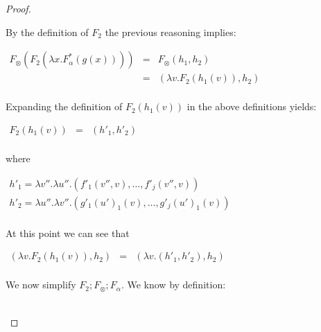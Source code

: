 \documentclass{elsarticle}
\begin{document}
\begin{proof}
\begin{report}
\begin{center}
\begin{itemize}
      By the definition of $F_2$ the previous reasoning implies:
      \begin{center}
        \begin{math}
          \begin{array}{lll}
            F_\otimes(F_2(\lambda x.F^*_\alpha(g(x))))
            & = & F_\otimes(h_1,h_2)\\
            & = & (\lambda v.F_2(h_1(v)),h_2)\\
          \end{array}
        \end{math}
      \end{center}
      Expanding the definition of $F_2(h_1(v))$ in the above definitions yields:
      \begin{center}
        \begin{math}
          \begin{array}{lll}
            F_2(h_1(v))
            & = & (h'_1,h'_2)\\
          \end{array}
        \end{math}
      \end{center}
      where
      \begin{center}
        \begin{math}
          \begin{array}{lll}
            h'_1 = \lambda v''.\lambda u''.(f'_1(v'',v),\ldots,f'_j(v'',v))\\
            h'_2 = \lambda u''.\lambda v''.(g'_1(u')_1(v),\ldots,g'_j(u')_1(v))\\
          \end{array}
        \end{math}
      \end{center}
      At this point we can see that
      \begin{center}
        \begin{math}
          \begin{array}{lll}
            (\lambda v.F_2(h_1(v)),h_2) & = & (\lambda v.(h'_1,h'_2),h_2)\\
          \end{array}
        \end{math}
      \end{center}
      We now simplify $F_2;F_\otimes;F_\alpha$.  We know by definition:
      \begin{center}
        \begin{math}
          \begin{array}{lll}

\end{array}
\end{math}
\end{center}
\end{itemize}
\end{center}
\end{report}
\end{proof}
\end{document}
